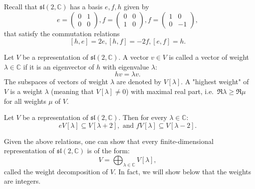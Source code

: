 \documentclass{report}
\begin{document}
Recall that $\mathfrak{sl}(2, \mathbb C)$ has a basis $e, f, h$ given by
\[
e = \begin{pmatrix}
    0 & 1 \\
    0 & 0
\end{pmatrix},
f = \begin{pmatrix}
    0 & 0 \\
    1 & 0
\end{pmatrix},
f = \begin{pmatrix}
    1 & 0 \\
    0 & -1
\end{pmatrix},
\]
that satisfy the commutation relations
\[
[h, e] = 2e, [h, f] = -2f, [e, f] = h.
\]

\begin{definition}
    Let $V$ be a representation of $\mathfrak{sl}(2, \mathbb C)$.
    A vector $v \in V$ is called a vector of weight $\lambda \in \mathbb C$ if it is an eigenvector of $h$ with eigenvalue $\lambda$:
    \[
    h v = \lambda v.
    \]
    The subspaces of vectors of weight $\lambda$ are denoted by $V[\lambda]$.
    A "highest weight" of $V$ is a weight $\lambda$ (meaning that $V[\lambda] \neq 0$) with maximal real part, i.e.\ $\Re \lambda \geq \Re \mu$ for all weights $\mu$ of $V$.
\end{definition}
\begin{lemma}
    Let $V$ be a representation of $\mathfrak{sl}(2, \mathbb C)$.
    Then for every $\lambda \in \mathbb C$:
    \[
    e V[\lambda] \subseteq V[\lambda + 2], \text{ and } f V[\lambda] \subseteq V[\lambda - 2].
    \]
\end{lemma}

Given the above relations, one can show that every finite-dimensional representation of $\mathfrak{sl}(2, \mathbb C)$ is of the form:
\[
V = \bigoplus_{\lambda \in \mathbb C} V[\lambda],
\]
called the weight decomposition of $V$.
In fact, we will show below that the weights are integers.
\end{document}
